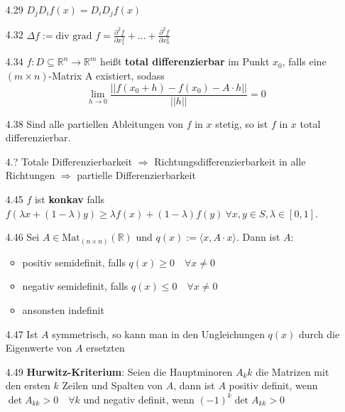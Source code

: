 \documentclass{scrartcl}
\begin{document}
\begin{itemize}
    \item [4.29] $D_jD_if(x) = D_iD_jf(x)$

    \item [4.32] $\Delta f := \text{div grad }f = \frac{\partial^2 f}{\partial x_1^2} + \hdots + \frac{\partial^2 f}{\partial x_n^2}$

    \item [4.34] $f: D \subseteq \mathbb{R}^n \to \mathbb{R}^m$ heißt \textbf{total differenzierbar} im Punkt $x_0$, falls eine $(m \times n)$-Matrix A existiert, sodass\\
    \begin{equation*}
        \lim_{h \to 0} \frac{||f(x_0 + h) - f(x_0) - A \cdot h||}{||h||} = 0
    \end{equation*}   

    \item [4.38] Sind alle partiellen Ableitungen von $f$ in $x$ stetig, so ist $f$ in $x$ total differenzierbar.

    \item [4.?] Totale Differenzierbarkeit $\Rightarrow$ Richtungsdifferenzierbarkeit in alle Richtungen $\Rightarrow$ partielle Differenzierbarkeit

    \item [4.45] $f$ ist \textbf{konkav} falls $f(\lambda x + (1-\lambda)y) \geq \lambda f(x) + (1-\lambda)f(y)\ \forall x,y \in S,\lambda\in[0,1]$.

    \item [4.46] Sei $A \in \text{Mat}_{(n \times n)}(\mathbb{R})$ und $q(x) := \langle x, A\cdot x \rangle$. Dann ist $A$:
    \begin{itemize}
        \item positiv semidefinit, falls $q(x) \geq 0\quad\forall x \neq 0$
        \item negativ semidefinit, falls $q(x) \leq 0\quad\forall x \neq 0$
        \item ansonsten indefinit
    \end{itemize}

    \item [4.47] Ist $A$ symmetrisch, so kann man in den Ungleichungen $q(x)$ durch die Eigenwerte von $A$ ersetzten

    \item [4.49] \textbf{Hurwitz-Kriterium}: Seien die Hauptminoren $A_kk$ die Matrizen mit den ersten $k$ Zeilen und Spalten von $A$, dann ist $A$ positiv definit, wenn $\det A_{kk} > 0\quad\forall k$ und negativ definit, wenn $(-1)^k \det A_{kk} > 0$


\end{itemize}
\end{document}
